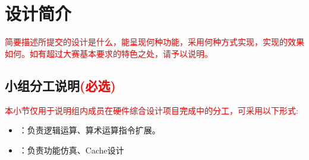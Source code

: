 \section{设计简介}
\textcolor{red}{简要描述所提交的设计是什么，能呈现何种功能，采用何种方式实现，实现的效果如何。如有超过大赛基本要求的特色之处，请予以说明。}

\subsection{小组分工说明\textcolor{red}{(必选)}}

\textcolor{red}{
本小节仅用于说明组内成员在硬件综合设计项目完成中的分工，可采用以下形式:}

\begin{itemize}
    \item \stunamea：负责逻辑运算、算术运算指令扩展。
    \item \stunameb：负责功能仿真、Cache设计
\end{itemize}